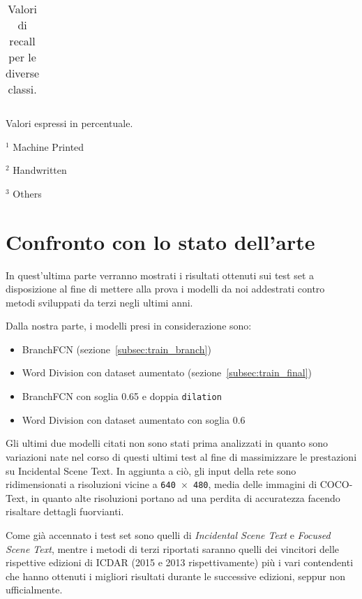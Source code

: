 \begin{sidewaystable}
\begin{table}[H]
{\begin{threeparttable}
\begin{tabular}{l *{5}c >{\it\/}c *{3}c >{\it\/}c >{\bf}c }
		\bottomrule
	\end{tabular}
	\begin{tablenotes}
		\item \footnotesize{Valori espressi in percentuale.}
		\item \footnotesize{$^1$ Machine Printed}
		\item \footnotesize{$^2$ Handwritten}
		\item \footnotesize{$^3$ Others}
	\end{tablenotes}
\end{threeparttable}%
}
\caption{Valori di recall per le diverse classi.}\label{tab:results_recall}
\end{table}
\end{sidewaystable}


\section{Confronto con lo stato dell'arte}
In quest'ultima parte verranno mostrati i risultati ottenuti sui test set a disposizione al fine di mettere alla prova i modelli da noi addestrati contro metodi sviluppati da terzi negli ultimi anni.\par
Dalla nostra parte, i modelli presi in considerazione sono: 
\begin{itemize}
	\item
		BranchFCN (sezione~\ref{subsec:train_branch})
	\item
		Word Division con dataset aumentato (sezione~\ref{subsec:train_final})
	\item
		BranchFCN con soglia 0.65 e doppia \texttt{dilation}
	\item
		Word Division con dataset aumentato con soglia 0.6
\end{itemize}

Gli ultimi due modelli citati non sono stati prima analizzati in quanto sono variazioni nate nel corso di questi ultimi test al fine di massimizzare le prestazioni su Incidental Scene Text. In aggiunta a ciò, gli input della rete sono ridimensionati a risoluzioni vicine a \texttt{640 $\times$ 480}, media delle immagini di COCO-Text, in quanto alte risoluzioni portano ad una perdita di accuratezza facendo risaltare dettagli fuorvianti.\par
Come già accennato i test set sono quelli di \textit{Incidental Scene Text} e \textit{Focused Scene Text}, mentre i metodi di terzi riportati saranno quelli dei vincitori delle rispettive edizioni di ICDAR (2015 e 2013 rispettivamente) più i vari contendenti che hanno ottenuti i migliori risultati durante le successive edizioni, seppur non ufficialmente.

